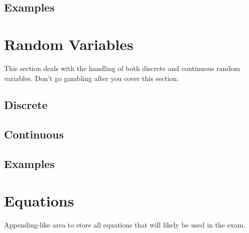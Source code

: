 \subsection{Examples}

\section{Random Variables}
This section deals with the handling of both discrete and continuous random variables. Don't go gambling after you cover this section.
\subsection{Discrete}
\subsection{Continuous}
\subsection{Examples}

\section{Equations}
Appending-like area to store all equations that will likely be used in the exam.
